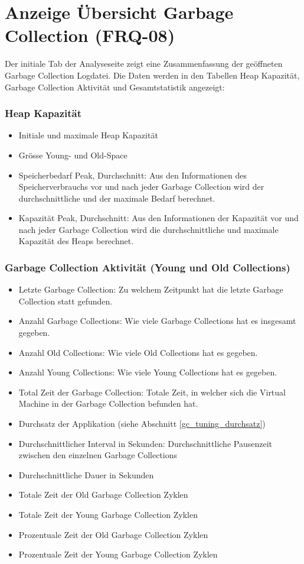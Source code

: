 \section{Anzeige Übersicht Garbage Collection (FRQ-08)}\label{standardreport}
Der initiale Tab der Analyseseite zeigt eine Zusammenfassung der geöffneten Garbage Collection Logdatei. Die Daten werden in den Tabellen Heap Kapazität, Garbage Collection Aktivität und Gesamtstatistik angezeigt:

\subsubsection{Heap Kapazität}
\begin{itemize}
	\item Initiale und maximale Heap Kapazität
	\item Grösse Young- und Old-Space
	\item Speicherbedarf Peak, Durchschnitt: Aus den Informationen des Speicherverbrauchs vor und nach jeder Garbage Collection wird der durchschnittliche und der maximale Bedarf berechnet.
	\item Kapazität Peak, Durchschnitt: Aus den Informationen der Kapazität vor und nach jeder Garbage Collection wird die durchschnittliche und maximale Kapazität des Heaps berechnet.

\end{itemize}
\subsubsection{Garbage Collection Aktivität (Young und Old Collections)}
\begin{itemize}
	\item Letzte Garbage Collection: Zu welchem Zeitpunkt hat die letzte Garbage Collection statt gefunden.
	\item Anzahl Garbage Collections: Wie viele Garbage Collections hat es insgesamt gegeben.
	\item  Anzahl Old Collections: Wie viele Old Collections hat es gegeben.
	\item Anzahl Young Collections: Wie viele Young Collections hat es gegeben.
	\item Total Zeit der Garbage Collection: Totale Zeit, in welcher sich die Virtual Machine in der Garbage Collection befunden hat.
	\item Durchsatz der Applikation (siehe Abschnitt \ref{gc_tuning_durchsatz})

	\item Durchschnittlicher Interval in Sekunden: Durchschnittliche Pausenzeit zwischen den einzelnen Garbage Collections
	\item Durchschnittliche Dauer in Sekunden
	\item Totale Zeit der Old Garbage Collection Zyklen
	\item Totale Zeit der Young Garbage Collection Zyklen
	\item Prozentuale Zeit der Old Garbage Collection Zyklen
	\item Prozentuale Zeit der Young Garbage Collection Zyklen
\end{itemize}	

